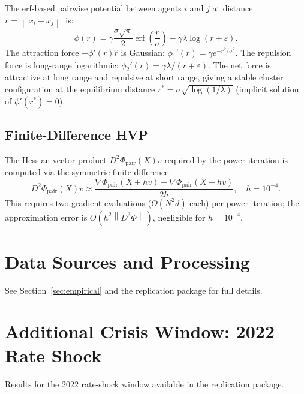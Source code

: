 \documentclass[11pt]{article}
\theoremstyle{definition}
\DeclareMathOperator{\erf}{erf}
\newcommand{\grad}{\nabla}
\newcommand{\norm}[1]{\left\|#1\right\|}
\begin{document}
\begin{appendices}
The erf-based pairwise potential between agents $i$ and $j$ at distance
$r = \norm{x_i - x_j}$ is:
\[
  \phi(r) = \gamma\frac{\sigma\sqrt{\pi}}{2}\erf\!\left(\frac{r}{\sigma}\right)
            - \gamma\lambda\log(r + \varepsilon).
\]
The attraction force $-\phi'(r)\hat r$ is Gaussian: $\phi_1'(r) = \gamma e^{-r^2/\sigma^2}$.
The repulsion force is long-range logarithmic: $\phi_2'(r) = \gamma\lambda/(r+\varepsilon)$.
The net force is attractive at long range and repulsive at short range, giving a
stable cluster configuration at the equilibrium distance
$r^* = \sigma\sqrt{\log(1/\lambda)}$ (implicit solution of $\phi'(r^*) = 0$).

\subsection{Finite-Difference HVP}

The Hessian-vector product $D^2\Phi_{\mathrm{pair}}(X)v$ required by the power
iteration is computed via the symmetric finite difference:
\[
  D^2\Phi_{\mathrm{pair}}(X)v \approx
  \frac{\grad\Phi_{\mathrm{pair}}(X + hv) - \grad\Phi_{\mathrm{pair}}(X - hv)}{2h},
  \quad h = 10^{-4}.
\]
This requires two gradient evaluations ($O(N^2 d)$ each) per power iteration; the
approximation error is $O(h^2\norm{D^3\Phi})$, negligible for $h = 10^{-4}$.

\section{Data Sources and Processing}
\label{app:data}

See Section~\ref{sec:empirical} and the replication package for full details.

\section{Additional Crisis Window: 2022 Rate Shock}
\label{app:2022}

Results for the 2022 rate-shock window available in the replication package.

\end{appendices}
\end{document}

